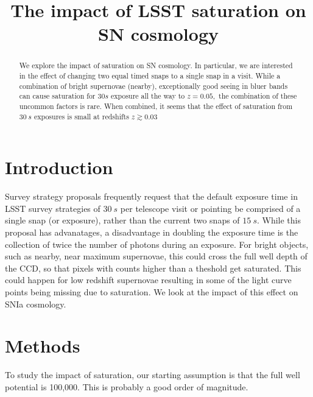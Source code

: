 \documentclass[\docopts]{\docclass}
\begin{document}
\title{The impact of LSST saturation on SN cosmology}

\maketitlepre

\begin{abstract}
We explore the impact of saturation on SN cosmology. In particular, we are interested in the effect of changing two equal timed snaps to a single snap in a visit. While a combination of bright supernovae (nearby), exceptionally good seeing in bluer bands can cause saturation for $30 s$ exposure all the way to $z = 0.05,$ the  combination of these uncommon factors is rare. When combined, it seems that the effect of saturation from $30~s$ exposures is small at redshifts $z \gtrsim 0.03$ 
\end{abstract}


\maketitlepost

\section{Introduction}
\label{sec:intro}
Survey strategy proposals frequently request that the default exposure time in LSST survey strategies
of $30~s$ per telescope visit or pointing be comprised of a single snap (or exposure), rather than the current two snaps of $15~s.$ While this proposal has advanatages, a disadvantage in doubling the exposure time is the collection of twice the number of photons during an exposure. For bright objects, such as nearby, near maximum supernovae, this could cross the full well depth of the CCD, so that pixels with counts higher than a theshold get saturated. This could happen for low redshift supernovae resulting in some of the light curve points being missing due to saturation. We look at the impact of this effect on SNIa cosmology.  

\section{Methods}
\label{sec:methods}
To study the impact of saturation, our starting assumption is that the full well potential is 100,000. This is probably a good order of magnitude.
\end{document}
